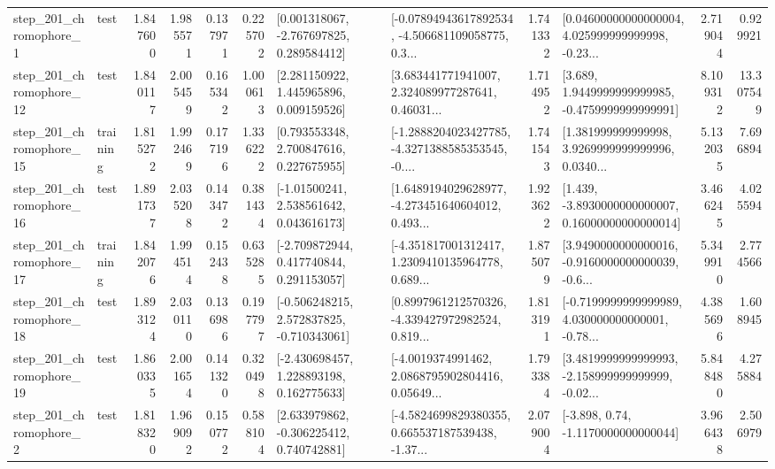 \begin{tabular}{llrrrrllrlrr}
   step\_201\_chromophore\_1 &      test &      1.847600 &    1.985571 &      0.137971 &  0.225702 &    [0.001318067, -2.767697825, 0.289584412] &  [-0.07894943617892534, -4.506681109058775, 0.3... &       1.741332 &  [0.04600000000000004, 4.025999999999998, -0.23... &            2.719044 &          0.929921 \\
  step\_201\_chromophore\_12 &      test &      1.840117 &    2.005459 &      0.165342 &  1.000613 &     [2.281150922, 1.445965896, 0.009159526] &  [3.683441771941007, 2.324089977287641, 0.46031... &       1.714952 &   [3.689, 1.9449999999999985, -0.4759999999999991] &            8.109312 &         13.307549 \\
  step\_201\_chromophore\_15 &  training &      1.815272 &    1.992469 &      0.177196 &  1.336222 &     [0.793553348, 2.700847616, 0.227675955] &  [-1.2888204023427785, -4.3271388585353545, -0.... &       1.741543 &  [1.381999999999998, 3.9269999999999996, 0.0340... &            5.132035 &          7.696894 \\
  step\_201\_chromophore\_16 &      test &      1.891737 &    2.035208 &      0.143472 &  0.381434 &     [-1.01500241, 2.538561642, 0.043616173] &  [1.6489194029628977, -4.273451640604012, 0.493... &       1.923622 &  [1.439, -3.8930000000000007, 0.16000000000000014] &            3.466245 &          4.025594 \\
  step\_201\_chromophore\_17 &  training &      1.842076 &    1.994514 &      0.152438 &  0.635285 &    [-2.709872944, 0.417740844, 0.291153057] &  [-4.351817001312417, 1.2309410135964778, 0.689... &       1.875079 &  [3.9490000000000016, -0.9160000000000039, -0.6... &            5.349910 &          2.774566 \\
  step\_201\_chromophore\_18 &      test &      1.893124 &    2.030110 &      0.136986 &  0.197797 &   [-0.506248215, 2.572837825, -0.710343061] &  [0.8997961212570326, -4.339427972982524, 0.819... &       1.813191 &  [-0.7199999999999989, 4.030000000000001, -0.78... &            4.385696 &          1.608945 \\
  step\_201\_chromophore\_19 &      test &      1.860335 &    2.001654 &      0.141320 &  0.320498 &    [-2.430698457, 1.228893198, 0.162775633] &  [-4.0019374991462, 2.0868795902804416, 0.05649... &       1.793384 &  [3.4819999999999993, -2.158999999999999, -0.02... &            5.848480 &          4.275884 \\
   step\_201\_chromophore\_2 &      test &      1.818320 &    1.969092 &      0.150772 &  0.588104 &    [2.633979862, -0.306225412, 0.740742881] &  [-4.5824699829380355, 0.665537187539438, -1.37... &       2.079004 &                [-3.898, 0.74, -1.1170000000000044] &            3.966438 &          2.506979 \\

\end{tabular}
